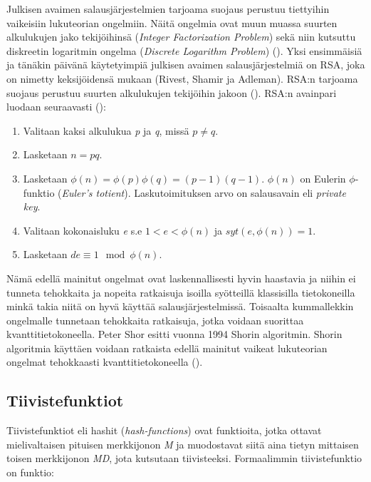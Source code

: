   Julkisen avaimen salausjärjestelmien tarjoama suojaus perustuu tiettyihin vaikeisiin lukuteorian ongelmiin. Näitä ongelmia ovat muun muassa suurten alkulukujen jako tekijöihinsä (\emph{Integer Factorization Problem}) sekä niin kutsuttu diskreetin logaritmin ongelma (\emph{Discrete Logarithm Problem}) (\cite{10.1007/978-3-319-11659-4_15}).
  Yksi ensimmäisiä ja tänäkin päivänä käytetyimpiä julkisen avaimen salausjärjestelmiä on RSA, joka on nimetty keksijöidensä mukaan (Rivest, Shamir ja Adleman). RSA:n tarjoama suojaus perustuu suurten alkulukujen tekijöihin jakoon (\cite{montgomery1994survey}). RSA:n avainpari luodaan seuraavasti  (\cite{doi:10.1080/23742917.2016.1226650}):
  
  \begin{enumerate}
      \item Valitaan kaksi alkulukua \emph{p} ja \emph{q}, missä $p \neq q$.
      \item Lasketaan $n = pq$.
      \item Lasketaan $\phi(n) = \phi(p)\phi(q) = (p-1)(q-1)$. $\phi(n)$ on Eulerin $\phi$-funktio (\emph{Euler's totient}). Laskutoimituksen arvo on salausavain eli \emph{private key}.
      \item Valitaan kokonaisluku \emph{e} s.e $1 < e < \phi(n)$ ja $syt(e, \phi(n)) = 1$.
      \item Lasketaan $de \equiv 1 \mod \phi(n)$.
  \end{enumerate}
  
 Nämä edellä mainitut ongelmat ovat laskennallisesti hyvin haastavia ja niihin ei tunneta tehokkaita ja nopeita ratkaisuja isoilla syötteillä klassisilla tietokoneilla minkä takia niitä on hyvä käyttää salausjärjestelmissä. Toisaalta kummallekkin ongelmalle tunnetaan tehokkaita ratkaisuja, jotka voidaan suorittaa kvanttitietokoneella. Peter Shor esitti vuonna 1994 Shorin algoritmin. Shorin algoritmia käyttäen voidaan ratkaista edellä mainitut vaikeat lukuteorian ongelmat tehokkaasti kvanttitietokoneella (\cite{10.1007/978-3-319-11659-4_15}).
 
 \subsection{Tiivistefunktiot}
 Tiivistefunktiot eli hashit (\emph{hash-functions}) ovat funktioita, jotka ottavat mielivaltaisen pituisen merkkijonon \emph{M} ja muodostavat siitä aina tietyn mittaisen toisen merkkijonon \emph{MD}, jota kutsutaan tiivisteeksi. Formaalimmin tiivistefunktio on funktio:
 
